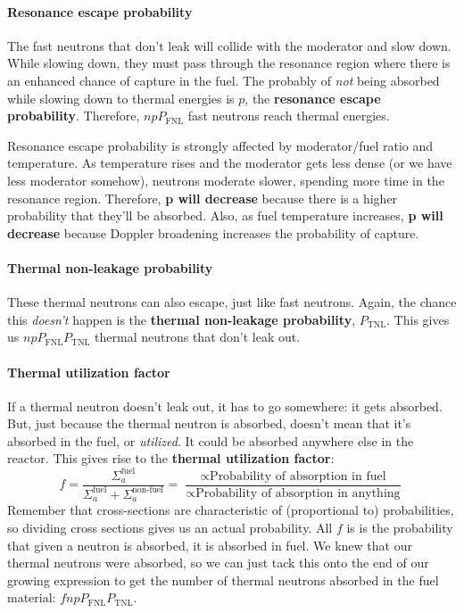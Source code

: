 \documentclass[letter]{article}
\begin{document}
\paragraph{Resonance escape probability}
The fast neutrons that don't leak will collide with the
  moderator and slow down. While slowing down, they must pass through
  the resonance region where there is an enhanced chance of capture in
  the fuel. The probably of \textit{not} being absorbed while slowing
  down to thermal energies is $p$, the \textbf{resonance escape
    probability}. Therefore, $npP_{\text{FNL}}$ fast neutrons reach
  thermal energies.
  \begin{framed}
    Resonance escape probability is strongly affected by moderator/fuel ratio
    and temperature. As temperature rises and the moderator gets less
    dense (or we have less moderator somehow), neutrons moderate
    slower, spending more time in the resonance region. Therefore,
    \textbf{p will decrease} because there is a higher probability
    that they'll be absorbed. Also, as fuel temperature increases,
    \textbf{p will decrease} because Doppler broadening increases the
    probability of capture.\cite[Lec. 10]{lecture}
  \end{framed}

\paragraph{Thermal non-leakage probability}
These thermal neutrons can also escape, just like fast
  neutrons. Again, the chance this \textit{doesn't} happen is the
  \textbf{thermal non-leakage probability}, $P_{\text{TNL}}$. This
  gives us $npP_{\text{FNL}}P_{\text{TNL}}$ thermal neutrons that
  don't leak out.

\paragraph{Thermal utilization factor}
If a thermal neutron doesn't leak out, it has to go somewhere:
  it gets absorbed. But, just because the thermal neutron is absorbed,
  doesn't mean that it's absorbed in the fuel, or
  \textit{utilized}. It could be absorbed anywhere else in the
  reactor. This gives rise to the \textbf{thermal utilization factor}:
  \begin{equation*}
    f=\frac{\Sigma_a^{\text{fuel}}}{\Sigma^{\text{fuel}}_a+\Sigma^{\text{non-fuel}}_a}=\frac{\propto
      \text{Probability of absorption in fuel}}{\propto
      \text{Probability of absorption in anything}}
  \end{equation*}
Remember that cross-sections are characteristic of (proportional to) probabilities, so
dividing cross sections gives us an actual probability. All $f$ is is
the probability that given a neutron is absorbed, it is absorbed in
fuel. We knew that our thermal neutrons were absorbed, so we can just
tack this onto the end of our growing expression to get the number of
thermal neutrons absorbed in the fuel material:
$fnpP_{\text{FNL}}P_{\text{TNL}}$.
\end{document}
